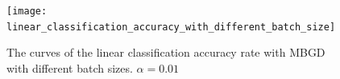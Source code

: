 \documentclass[journal, a4paper]{IEEEtran}
\begin{document}
\begin{figure}[!hbt]
    \begin{center}
    \texttt{[image: linear\_classification\_accuracy\_with\_different\_batch\_size]}
    \caption{The curves of the linear classification accuracy rate with MBGD with different batch sizes. $\alpha=0.01$}
    \label{fig:linear_classification_accuracy_with_different_batch_size}
    \end{center}
\end{figure}














\end{document}
